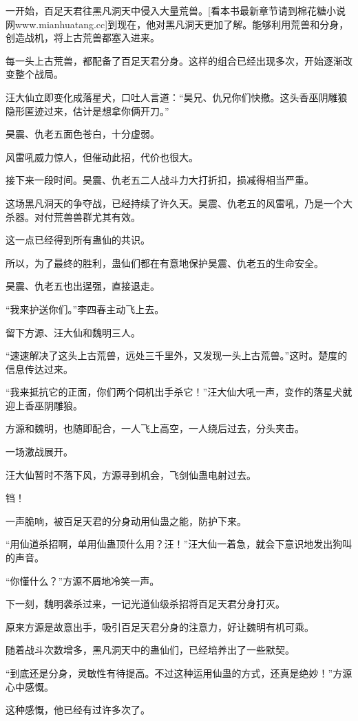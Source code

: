 \begin{this_body}
一开始，百足天君往黑凡洞天中侵入大量荒兽。[看本书最新章节请到棉花糖小说网www.mianhuatang.cc]到现在，他对黑凡洞天更加了解。能够利用荒兽和分身，创造战机，将上古荒兽都塞入进来。

每一头上古荒兽，都配备了百足天君分身。这样的组合已经出现多次，开始逐渐改变整个战局。

汪大仙立即变化成落星犬，口吐人言道：“昊兄、仇兄你们快撤。这头香巫阴雕狼隐形匿迹过来，估计是想拿你俩开刀。”

昊震、仇老五面色苍白，十分虚弱。

风雷吼威力惊人，但催动此招，代价也很大。

接下来一段时间。昊震、仇老五二人战斗力大打折扣，损减得相当严重。

这场黑凡洞天的争夺战，已经持续了许久天。昊震、仇老五的风雷吼，乃是一个大杀器。对付荒兽兽群尤其有效。

这一点已经得到所有蛊仙的共识。

所以，为了最终的胜利，蛊仙们都在有意地保护昊震、仇老五的生命安全。

昊震、仇老五也出逞强，直接退走。

“我来护送你们。”李四春主动飞上去。

留下方源、汪大仙和魏明三人。

“速速解决了这头上古荒兽，远处三千里外，又发现一头上古荒兽。”这时。楚度的信息传达过来。

“我来抵抗它的正面，你们两个伺机出手杀它！”汪大仙大吼一声，变作的落星犬就迎上香巫阴雕狼。

方源和魏明，也随即配合，一人飞上高空，一人绕后过去，分头夹击。

一场激战展开。

汪大仙暂时不落下风，方源寻到机会，飞剑仙蛊电射过去。

铛！

一声脆响，被百足天君的分身动用仙蛊之能，防护下来。

“用仙道杀招啊，单用仙蛊顶什么用？汪！”汪大仙一着急，就会下意识地发出狗叫的声音。

“你懂什么？”方源不屑地冷笑一声。

下一刻，魏明袭杀过来，一记光道仙级杀招将百足天君分身打灭。

原来方源是故意出手，吸引百足天君分身的注意力，好让魏明有机可乘。

随着战斗次数增多，黑凡洞天中的蛊仙们，已经培养出了一些默契。

“到底还是分身，灵敏性有待提高。不过这种运用仙蛊的方式，还真是绝妙！”方源心中感慨。

这种感慨，他已经有过许多次了。


\end{this_body}
